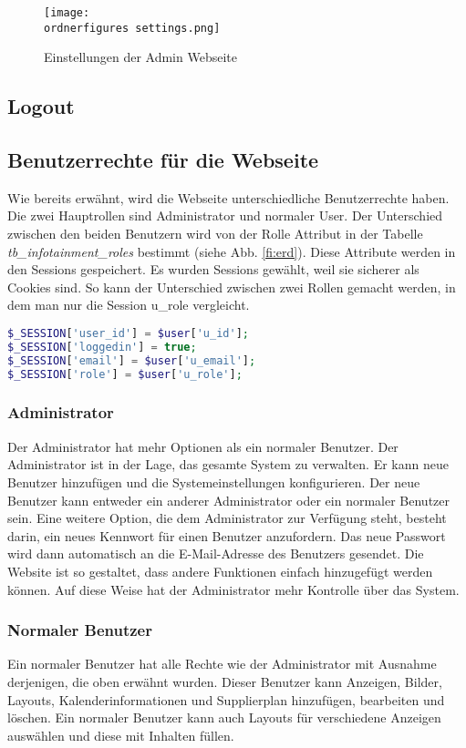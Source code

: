 \begin{figure}[H]
	\centering
	\texttt{[image: \\ordnerfigures settings.png]}
	\caption{Einstellungen der Admin Webseite}
	\label{fi:settings}
\end{figure}

\subsection{Logout}

\subsection{Benutzerrechte für die Webseite}
Wie bereits erwähnt, wird die Webseite unterschiedliche Benutzerrechte haben. Die zwei Hauptrollen sind Administrator und normaler User. Der Unterschied zwischen den beiden Benutzern wird von der Rolle Attribut in der Tabelle \textit{tb\_infotainment\_roles} bestimmt (siehe Abb. \ref{fi:erd}). Diese Attribute werden in den Sessions gespeichert. Es wurden Sessions gewählt, weil sie sicherer als Cookies sind. \cite{40_sessions_cookies} So kann der Unterschied zwischen zwei Rollen gemacht werden, in dem man nur die Session u\_role vergleicht.
\begin{lstlisting}[caption={Speicherung der Benutzer Informationen in Sessions},label={lst:sessions},language=PHP]
$_SESSION['user_id'] = $user['u_id'];
$_SESSION['loggedin'] = true;
$_SESSION['email'] = $user['u_email'];
$_SESSION['role'] = $user['u_role'];
\end{lstlisting}

\subsubsection{Administrator}
Der Administrator hat mehr Optionen als ein normaler Benutzer. Der Administrator ist in der Lage, das gesamte System zu verwalten. Er kann neue Benutzer hinzufügen und die Systemeinstellungen konfigurieren. Der neue Benutzer kann entweder ein anderer Administrator oder ein normaler Benutzer sein. Eine weitere Option, die dem Administrator zur Verfügung steht, besteht darin, ein neues Kennwort für einen Benutzer anzufordern. Das neue Passwort wird dann automatisch an die E-Mail-Adresse des Benutzers gesendet. Die Website ist so gestaltet, dass andere Funktionen einfach hinzugefügt werden können. Auf diese Weise hat der Administrator mehr Kontrolle über das System.

\subsubsection{Normaler Benutzer}
Ein normaler Benutzer hat alle Rechte wie der Administrator mit Ausnahme derjenigen, die oben erwähnt wurden. Dieser Benutzer kann Anzeigen, Bilder, Layouts, Kalenderinformationen und Supplierplan hinzufügen, bearbeiten und löschen. Ein normaler Benutzer kann auch Layouts für verschiedene Anzeigen auswählen und diese mit Inhalten füllen.


